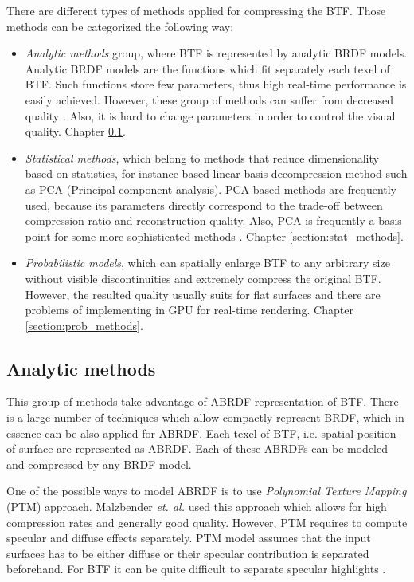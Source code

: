 There are different types of methods applied for compressing the BTF. Those methods can be categorized the following way:

\begin{itemize}
  \item \emph{Analytic methods} group, where BTF is represented by analytic BRDF models. 
Analytic BRDF models are the functions which fit separately each texel of BTF. Such functions store few parameters, thus high real-time performance is easily achieved.
However, these group of methods can suffer from decreased quality \cite{haindl}. Also, it is hard to change parameters in order to control the visual quality. Chapter  \ref{section:analytic_methods}.
   \item \emph{Statistical methods}, which belong to methods that reduce dimensionality based on  statistics, for instance based linear basis decompression method such as PCA (Principal component analysis). 
    PCA based methods are frequently used, because its parameters directly correspond to the trade-off between compression ratio and reconstruction quality.
    Also, PCA is frequently a basis point for some more sophisticated methods \cite{webglbtfstreaming}. Chapter \ref{section:stat_methods}.
   \item \emph{Probabilistic models}, which can spatially enlarge BTF to any arbitrary size without visible discontinuities and extremely compress the original BTF.
   However, the resulted quality usually suits for flat surfaces and there are problems of implementing in GPU for real-time rendering. Chapter \ref{section:prob_methods}.
 \end{itemize}



 \subsection{Analytic methods}
\label{section:analytic_methods}	
 This group of methods take advantage of ABRDF representation of BTF. 
 There is a large number of techniques which allow compactly represent BRDF, which in essence can be also applied for ABRDF.
 Each texel of BTF, i.e. spatial position of surface are represented as ABRDF. Each of these ABRDFs can be modeled and compressed by any BRDF model.
 
One of the possible ways to model ABRDF is to use \emph{Polynomial Texture  Mapping} (PTM) approach.
Malzbender  \emph{et. al.} \cite{PTM} used this approach which allows for high compression rates and generally good quality. 
However, PTM requires to compute specular and diffuse effects separately. 
PTM model assumes that the input surfaces has to be either diffuse or their specular contribution is separated beforehand.
For BTF it can be quite difficult to separate specular highlights \cite{haindl}.

